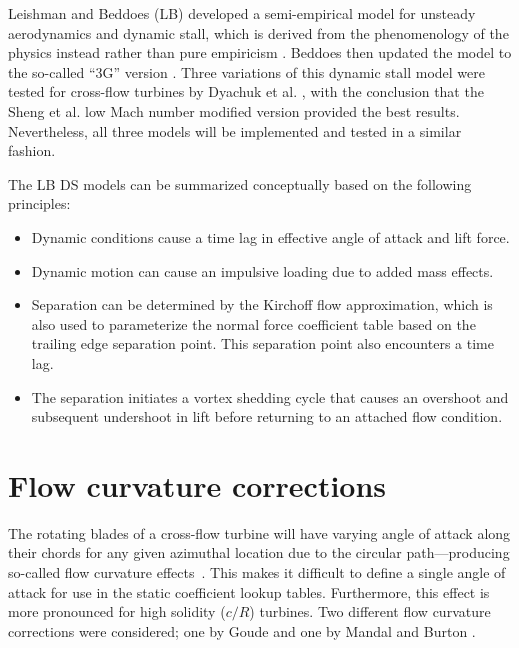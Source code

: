
Leishman and Beddoes (LB) developed a semi-empirical model for unsteady
aerodynamics and dynamic stall, which is derived from the phenomenology of the
physics instead rather than pure empiricism \cite{Leishman1989}. Beddoes then
updated the model to the so-called ``3G'' version \cite{Beddoes1993}. Three
variations of this dynamic stall model were tested for cross-flow turbines by
Dyachuk et al. \cite{Dyachuk2014}, with the conclusion that the Sheng et al. low
Mach number modified version \cite{Sheng2008} provided the best results.
Nevertheless, all three models will be implemented and tested in a similar
fashion.

The LB DS models can be summarized conceptually based on the following principles:
\begin{itemize}
    \item Dynamic conditions cause a time lag in effective angle of attack and
    lift force.
    
    \item Dynamic motion can cause an impulsive loading due to added mass
    effects.
    
    \item Separation can be determined by the Kirchoff flow approximation, which
    is also used to parameterize the normal force coefficient table based on the
    trailing edge separation point. This separation point also encounters a time
    lag.
    
    \item The separation initiates a vortex shedding cycle that causes an
    overshoot and subsequent undershoot in lift before returning to an attached
    flow condition.
\end{itemize}


\section{Flow curvature corrections}

The rotating blades of a cross-flow turbine will have varying angle of attack
along their chords for any given azimuthal location due to the circular
path---producing so-called flow curvature effects~\cite{Migliore1980}. This
makes it difficult to define a single angle of attack for use in the static
coefficient lookup tables. Furthermore, this effect is more pronounced for high
solidity ($c/R$) turbines. Two different flow curvature corrections were
considered; one by Goude \cite{Goude2012} and one by Mandal and Burton
\cite{Mandal1994}.

